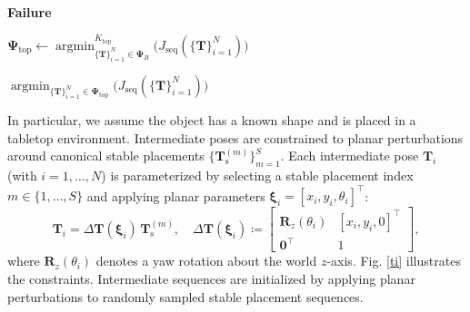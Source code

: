 \documentclass[journal, twoside]{IEEEtran}
\begin{document}
\begin{algorithm}[!htbp]
{    
    }
    \Return \textbf{Failure} \;
\end{algorithm}

\begin{algorithm}[!htbp]
    \small
    \caption{Batch Alternative of Step~3}
    \label{alg_batch_verify}
    \SetAlgoLined
    
    $\boldsymbol{\Psi}_{\mathrm{top}} \leftarrow \operatorname*{argmin}^{K_{\mathrm{top}}}_{\{\mathbf{T}\}_{i=1}^{N} \in \boldsymbol{\Psi}_B} \big( J_\mathrm{seq}(\{\mathbf{T}\}_{i=1}^{N}) \big)$ \;
    
    
    \Return $\operatorname*{argmin}_{\{\mathbf{T}\}_{i=1}^{N} \in \boldsymbol{\Psi}_{\mathrm{top}}} \big( J_\mathrm{seq}(\{\mathbf{T}\}_{i=1}^{N}) \big)$ \;
\end{algorithm}

In particular, we assume the object has a known shape and is placed in a tabletop environment. Intermediate poses are constrained to planar perturbations around canonical stable placements $\{\mathbf{T}_{\mathrm{s}}^{(m)}\}_{m=1}^{S}$. Each intermediate pose $\mathbf{T}_i$ (with $i=1,\dots,N$) is parameterized by selecting a stable placement index $m \in \{1,\dots,S\}$ and applying planar parameters $\boldsymbol{\xi}_i=[x_i,y_i,\theta_i]^\top$:
\begin{equation}
    \mathbf{T}_{i}
    =
    \Delta \mathbf{T}(\boldsymbol{\xi}_i)\,\mathbf{T}_{\mathrm{s}}^{(m)},
    \quad
    \Delta \mathbf{T}(\boldsymbol{\xi}_i)
    \coloneqq
    \begin{bmatrix}
    \mathbf{R}_z(\theta_i) & [x_i, y_i, 0]^\top \\
    \boldsymbol{0}^\top & 1
    \end{bmatrix},
    \label{eq_ensemble_init}
\end{equation}
where $\mathbf{R}_z(\theta_i)$ denotes a yaw rotation about the world $z$-axis. Fig. \ref{ti} illustrates the constraints. Intermediate sequences are initialized by applying planar perturbations to randomly sampled stable placement sequences.
\end{document}
